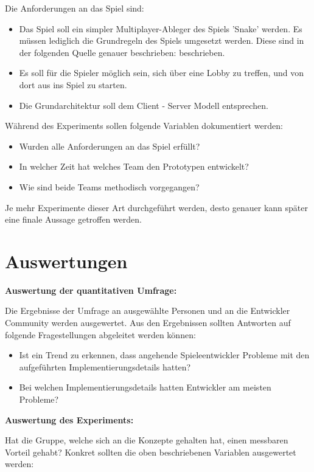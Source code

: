 Die Anforderungen an das Spiel sind:

\begin{itemize}
	\item Das Spiel soll ein simpler Multiplayer-Ableger des Spiels 'Snake' werden. Es müssen lediglich die Grundregeln des Spiels umgesetzt werden. Diese sind in der folgenden Quelle genauer beschrieben: \cite{.22.02.2022} beschrieben.
	\item Es soll für die Spieler möglich sein, sich über eine Lobby zu treffen, und von dort aus ins Spiel zu starten.
	\item Die Grundarchitektur soll dem Client - Server Modell entsprechen.
\end{itemize}

Während des Experiments sollen folgende Variablen dokumentiert werden:

\begin{itemize}
	\item Wurden alle Anforderungen an das Spiel erfüllt?
	\item In welcher Zeit hat welches Team den Prototypen entwickelt?
	\item Wie sind beide Teams methodisch vorgegangen?
\end{itemize}

Je mehr Experimente dieser Art durchgeführt werden, desto genauer kann später eine finale Aussage getroffen werden.

\section{Auswertungen}
\textbf{Auswertung der quantitativen Umfrage:}

Die Ergebnisse der Umfrage an ausgewählte Personen und an die Entwickler Community werden ausgewertet. Aus den Ergebnissen sollten Antworten auf folgende Fragestellungen abgeleitet werden können:

\begin{itemize}
	\item Ist ein Trend zu erkennen, dass angehende Spieleentwickler Probleme mit den aufgeführten Implementierungsdetails hatten?
	\item Bei welchen Implementierungsdetails hatten Entwickler am meisten Probleme?
\end{itemize}

\textbf{Auswertung des Experiments:}

Hat die Gruppe, welche sich an die Konzepte gehalten hat, einen messbaren Vorteil gehabt? Konkret sollten die oben beschriebenen Variablen ausgewertet werden:


